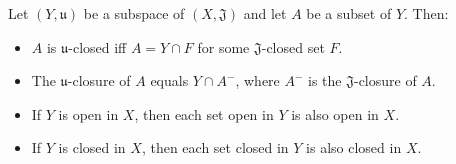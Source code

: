 Let $(Y, \mathfrak{u})$ be a subspace of $(X, \mathfrak{J})$ and let $A$ be a subset of $Y$. Then:
\begin{itemize}
\item $A$ is $\mathfrak{u}$-closed iff $A = Y \cap F$ for some $\mathfrak{J}$-closed set $F$.
\item The $\mathfrak{u}$-closure of $A$ equals $Y \cap A^{-}$, where $A^{-}$ is the $\mathfrak{J}$-closure of $A$.
\item If $Y$ is open in $X$, then each set open in $Y$ is also open in $X$.
\item If $Y$ is closed in $X$, then each set closed in $Y$ is also closed in $X$.
\end{itemize}
